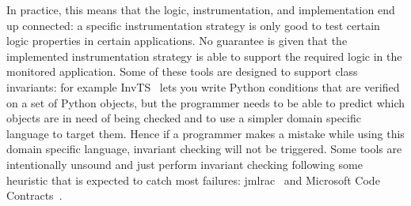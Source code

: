 In practice, this means that the logic, instrumentation, and implementation end up connected:
a specific instrumentation strategy is only good to test certain logic properties in certain applications.
No guarantee is given that the implemented instrumentation strategy is able to support the required logic in the monitored application.
Some of these tools are designed to support class invariants: for example InvTS~\cite{gorbovitski08efficient} lets you write Python conditions that are verified on a set of Python objects, but the programmer needs to be able
to predict which objects are in need of being checked and to use a simpler domain specific language to target them. Hence if a programmer makes a mistake while using this domain specific language, invariant checking
will not be triggered.
Some tools are intentionally unsound and just perform invariant checking following some heuristic that is expected to catch most failures: jmlrac~\cite{Burdy2005} and Microsoft Code Contracts~\cite{fahndrich2010embedded}.







%
%

